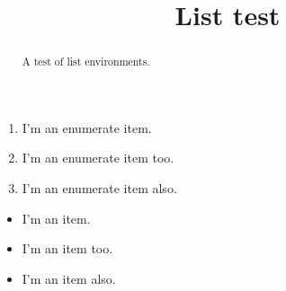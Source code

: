\documentclass{ximera}
\title{List test}
\begin{document}
\begin{abstract}
  A test of list environments.
\end{abstract}
\maketitle

\begin{enumerate}
\item I'm an enumerate item.
\item I'm an enumerate item too.
\item I'm an enumerate item also.
\end{enumerate}


\begin{itemize}
\item I'm an item.
\item I'm an item too.
\item I'm an item also.
\end{itemize}
\end{document}
